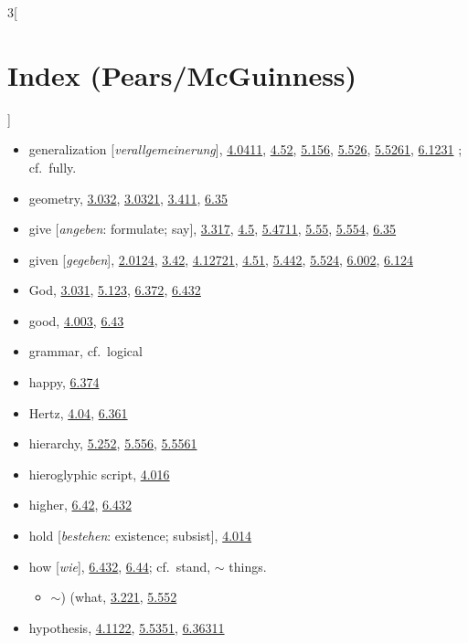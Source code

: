 \documentclass[oneside,openany,12pt]{book}
\newcommand{\indexentry}[1]{\item #1}
\newcommand{\indexsubentry}[1]{\begin{itemize} \item #1 \end{itemize}}
\newcommand{\indexref}[1]{\hyperlink{prop#1}{#1}}
\newcommand{\indexgap}{\bigskip}
\begin{document}
\begin{multicols}{3}[\section*{Index (Pears/McGuinness)}]
\begin{itemize}
   \indexsubentry{$\sim$ form, \indexref{3.312}, \indexref{4.1273}, \indexref{4.5}, \indexref{4.53}, \indexref{5.46}, \indexref{5.47}, \indexref{5.471}, \indexref{5.472}, \indexref{5.54}, \indexref{6}, \indexref{6.002}, \indexref{6.01}, \indexref{6.022}, \indexref{6.03}}

   \indexsubentry{$\sim$-ity-sign, \indexref{3.24}, \indexref{4.0411}, \indexref{5.522}, \indexref{5.523}, \indexref{6.1203}}

   \indexsubentry{$\sim$ validity, \indexref{6.1231}, \indexref{6.1232}}

\indexentry{generalization [\textit{verallgemeinerung}], \indexref{4.0411}, \indexref{4.52}, \indexref{5.156}, \indexref{5.526}, \indexref{5.5261}, \indexref{6.1231} ; cf.\ fully.}

\indexentry{geometry, \indexref{3.032}, \indexref{3.0321}, \indexref{3.411}, \indexref{6.35}}

\indexentry{give [\textit{angeben}: formulate; say], \indexref{3.317}, \indexref{4.5}, \indexref{5.4711}, \indexref{5.55}, \indexref{5.554}, \indexref{6.35}}

\indexentry{given [\textit{gegeben}], \indexref{2.0124}, \indexref{3.42}, \indexref{4.12721}, \indexref{4.51}, \indexref{5.442}, \indexref{5.524}, \indexref{6.002}, \indexref{6.124}}

\indexentry{God, \indexref{3.031}, \indexref{5.123}, \indexref{6.372}, \indexref{6.432}}

\indexentry{good, \indexref{4.003}, \indexref{6.43}}

\indexentry{grammar, cf.\ logical}

\indexgap

\indexentry{happy, \indexref{6.374}}

\indexentry{Hertz, \indexref{4.04}, \indexref{6.361}}

\indexentry{hierarchy, \indexref{5.252}, \indexref{5.556}, \indexref{5.5561}}

\indexentry{hieroglyphic script, \indexref{4.016}}

\indexentry{higher, \indexref{6.42}, \indexref{6.432}}

\indexentry{hold [\textit{bestehen}: existence; subsist], \indexref{4.014}}

\indexentry{how [\textit{wie}], \indexref{6.432}, \indexref{6.44}; cf.\ stand, $\sim$ things.}

   \indexsubentry{$\sim$) (what, \indexref{3.221}, \indexref{5.552}} %

\indexentry{hypothesis, \indexref{4.1122}, \indexref{5.5351}, \indexref{6.36311}}


\end{itemize}
\end{multicols}
\end{document}
